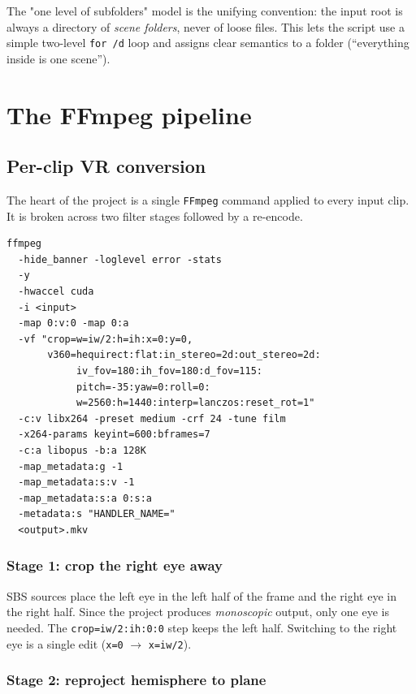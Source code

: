 \documentclass[11pt,a4paper]{article}
\begin{document}
The "one level of subfolders" model is the unifying convention: the
input root is always a directory of \emph{scene folders}, never of
loose files. This lets the script use a simple two-level
\texttt{for /d} loop and assigns clear semantics to a folder
(``everything inside is one scene'').

\section{The FFmpeg pipeline}

\subsection{Per-clip VR conversion}

The heart of the project is a single \texttt{FFmpeg} command applied to
every input clip. It is broken across two filter stages followed by a
re-encode.

\begin{lstlisting}[caption={Per-clip VR conversion command (line-broken
for readability; in the source it is one line).}]
ffmpeg
  -hide_banner -loglevel error -stats
  -y
  -hwaccel cuda
  -i <input>
  -map 0:v:0 -map 0:a
  -vf "crop=w=iw/2:h=ih:x=0:y=0,
       v360=hequirect:flat:in_stereo=2d:out_stereo=2d:
            iv_fov=180:ih_fov=180:d_fov=115:
            pitch=-35:yaw=0:roll=0:
            w=2560:h=1440:interp=lanczos:reset_rot=1"
  -c:v libx264 -preset medium -crf 24 -tune film
  -x264-params keyint=600:bframes=7
  -c:a libopus -b:a 128K
  -map_metadata:g -1
  -map_metadata:s:v -1
  -map_metadata:s:a 0:s:a
  -metadata:s "HANDLER_NAME="
  <output>.mkv
\end{lstlisting}

\subsubsection{Stage 1: crop the right eye away}

\textdegree{} SBS sources place the left eye in the left half of the
frame and the right eye in the right half. Since the project produces
\emph{monoscopic} output, only one eye is needed. The
\texttt{crop=iw/2:ih:0:0} step keeps the left half. Switching to the
right eye is a single edit (\texttt{x=0} $\rightarrow$ \texttt{x=iw/2}).

\subsubsection{Stage 2: reproject hemisphere to plane}
\end{document}
